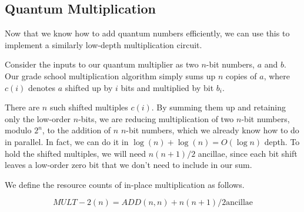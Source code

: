 \subsection{Quantum Multiplication}
\label{subsec:mult}

Now that we know how to add quantum numbers efficiently, we can use this
to implement a similarly low-depth multiplication circuit.

Consider the inputs to our quantum multiplier as two $n$-bit numbers,
$a$ and $b$.
Our grade school multiplication algorithm simply sums up $n$ copies of $a$,
where $c(i)$ denotes $a$ shifted up by $i$ bits and multiplied by bit $b_i$.


There are $n$ such shifted multiples $c(i)$. By summing them up and retaining
only the low-order $n$-bits, we are reducing multiplication of two $n$-bit
numbers, modulo $2^n$, to the addition of $n$ $n$-bit numbers, which we
already know how to do in parallel. In fact, we can do it in
$\log(n) + \log(n) = O(\log n)$ depth.
To hold the shifted multiples, we will
need $n(n+1)/2$ ancillae, since each bit shift leaves a low-order zero bit
that we don't need to include in our sum.

We define the resource counts of in-place multiplication as follows.

\begin{displaymath}
MULT-2(n) = ADD(n, n) + n(n+1)/2 \text{ancillae}
\end{displaymath}